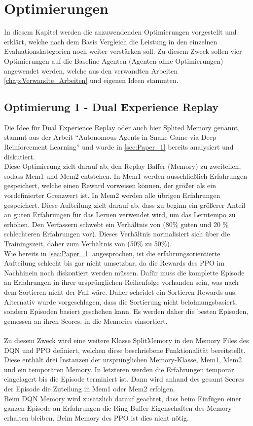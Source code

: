 \chapter{Optimierungen} \label{chap:Optimierungen}
In diesem Kapitel werden die anzuwendenden Optimierungen vorgestellt und erklärt, welche nach dem Basis Vergleich die Leistung in den einzelnen Evaluationskategorien noch weiter verstärken soll. Zu diesem Zweck sollen vier Optimierungen auf die Baseline Agenten (Agenten ohne Optimierungen) angewendet werden, welche aus den verwandten Arbeiten \ref{chap:Verwandte_Arbeiten} und eigenen Ideen stammten.

\section{Optimierung 1 - Dual Experience Replay}
Die Idee für Dual Experience Replay oder auch hier Splited Memory genannt, stammt aus der Arbeit "`Autonomous Agents in Snake Game via Deep Reinforcement Learning"' und wurde in \ref{sec:Paper_1} bereits analysiert und diskutiert.\\
Diese Optimierung zielt darauf ab, den Replay Baffer (Memory) zu zweiteilen, sodass Mem1 und Mem2 entstehen. In Mem1 werden ausschließlich Erfahrungen gespeichert, welche einen Reward vorweisen können, der größer als ein vordefinierter Grenzwert ist. In Mem2 werden alle übrigen Erfahrungen gespeichert. Diese Aufteilung zielt darauf ab, dass zu beginn ein größerer Anteil an guten Erfahrungen für das Lernen verwendet wird, um das Lerntempo zu erhöhen. Den Verfassern schwebt ein Verhältnis von (80\% guten und 20 \% schlechteren Erfahrungen vor). Dieses Verhältnis normalisiert sich über die Trainingszeit, daher zum Verhältnis von (50\% zu 50\%).\\
Wie bereits in \ref{sec:Paper_1} angesprochen, ist die erfahrungsorientierte Aufteilung schlecht bis gar nicht umsetzbar, da die Rewards des PPO im Nachhinein noch diskontiert werden müssen. Dafür muss die komplette Episode an Erfahrungen in ihrer ursprünglichen Reihenfolge vorhanden sein, was nach dem Sortieren nicht der Fall wäre. Daher scheidet ein Sortieren Rewards aus.\\
Alternativ wurde vorgeschlagen, dass die Sortierung nicht belohnungsbasiert, sondern Episoden basiert geschehen kann. Es werden daher die besten Episoden, gemessen an ihren Scores, in die Memories einsortiert.\\
\\ Zu diesem Zweck wird eine weitere Klasse SplitMemory in den Memory Files des DQN und PPO definiert, welchen diese beschriebene Funktionalität bereitstellt. Diese enthält drei Instanzen der ursprünglichen Memory-Klasse, Mem1, Mem2 und ein temporären Memory. In letzteren werden die Erfahrungen temporär eingelagert bis die Episode terminiert ist. Dann wird anhand des gesamt Scores der Episode die Zuteilung in Mem1 oder Mem2 erfolgen.\\
Beim DQN Memory wird zusätzlich darauf geachtet, dass beim Einfügen einer ganzen Episode an Erfahrungen die Ring-Buffer Eigenschaften des Memory erhalten bleiben. Beim Memory des PPO ist dies nicht nötig.

